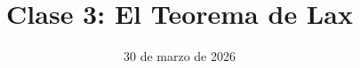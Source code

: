 
\title{Clase 3: El Teorema de Lax}
\date{30 de marzo de 2026}



\begin{frame}[plain]
	\titlepage
\end{frame}






